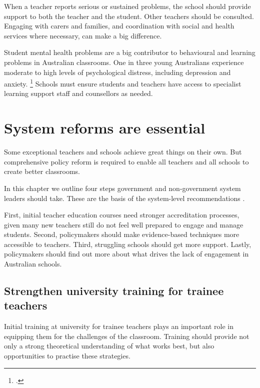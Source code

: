 \documentclass[FrontPage]{grattan}
\begin{document}
When a teacher reports serious or sustained problems, the school should provide support to both the teacher and the student. Other teachers should be consulted. Engaging with carers and families, and coordination with social and health services where necessary, can make a big difference.

Student mental health problems are a big contributor to behavioural and learning problems in Australian classrooms. One in three young Australians experience moderate to high levels of psychological distress, including depression and anxiety.%
    \footcite{Waters2011ReviewSchoolBased}
Schools must ensure students and teachers have access to specialist learning support staff and counsellors as needed.

\chapter{System reforms are essential}\label{chap:policy-reforms-essential}

Some exceptional teachers and schools achieve great things on their own. But comprehensive policy reform is required to enable all teachers and all schools to create better classrooms.
 
In this chapter we outline four steps government and non-government system leaders should take. These are the basis of the system-level recommendations .
 
First, initial teacher education courses need stronger accreditation processes, given many new teachers still do not feel well prepared to engage and manage students. 
Second, policymakers should make evidence-based techniques more accessible to teachers.
Third, struggling schools should get more support. %
Lastly, policymakers should find out more about what drives the lack of engagement in Australian schools. %
 
\section{Strengthen university training for trainee teachers}\label{sec:raise-initial-teacher-education}

Initial training at university for trainee teachers plays an important role in equipping them for the challenges of the classroom. Training should provide not only a strong theoretical understanding of what works best, but also opportunities to practise these strategies. 
\end{document}
